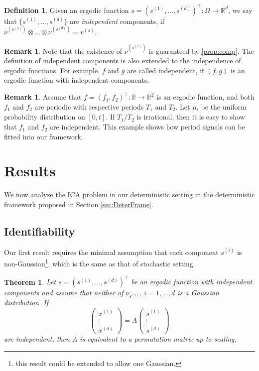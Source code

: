 \documentclass[twoside]{article}
\newcommand{\xcom}[1]{x^{(#1)}}
\newcommand{\scom}[1]{s^{(#1)}}
\newcommand{\real}{\mathbb{R}}
\newtheorem{thm}[lemma]{Theorem}
\theoremstyle{definition}
\newtheorem{definition}[lemma]{Definition}
\newtheorem{remark}[lemma]{Remark}
\begin{document}
\begin{definition}
Given an ergodic function $s = (s^{(1)},\ldots, s^{(d)})^{\top}:\Omega \rightarrow \real^d$, 
we say that $\{s^{(1)},\ldots, s^{(d)}\}$ are \emph{independent} components, 
	if $\nu^{(s^{(1)})}\otimes\ldots\otimes\nu^{(s^{(d)})} = v^{(s)}$.
\end{definition}
\begin{remark}
Note that the existence of $\nu^{(s^{(i)})}$ is guaranteed by \ref{prop:comp}. 
The definition of independent components is also extended to the independence of ergodic functions. 
For example, $f$ and $g$ are called independent, if $(f,g)$ is an ergodic function with independent components. 
\end{remark}
\begin{remark}
Assume that $f = (f_1,f_2)^{\top}:\real\rightarrow\real^2$ is an ergodic function, and both $f_1$ and $f_2$ are periodic with respective periods $T_1$ and $T_2$. 
Let $\mu_t$ be the uniform probability distribution on $[0,t]$. 
 If $T_1/T_2$ is irrational, then it is easy to show that $f_1$ and $f_2$ are independent. 
 This example shows how period signals can be fitted into our framework.
\end{remark}

\section{Results}
\label{sec:Results}
We now analyze the ICA problem in our deterministic setting in the deterministic framework proposed in Section \ref{sec:DeterFrame}.

\subsection{Identifiability}
\label{subsec:Indentifiability}
Our first result requires the minimal assumption that each component $s^{(i)}$ is non-Gaussian\footnote{this result could be extended to allow one Gaussian.}, which is the same as that of stochastic setting.
\begin{thm}
\label{thm:CorofICA}
Let $s = (\scom{1},\ldots,\scom{d})^{\top}$ be an ergodic function with independent components and %
assume that neither of $\nu_{\scom{i}}$, $i=1,\ldots,d$ is a Gaussian distribution. If
\begin{equation}
\left(
\begin{array}{ccc}
\xcom{1} \\
\vdots \\
\xcom{d}
\end{array}
\right) = A
\left(
\begin{array}{ccc}
\scom{1} \\
\vdots \\
\scom{d}
\end{array}
\right)
\end{equation}
are independent, then $A$ is equivalent to a permutation matrix up to scaling.
\end{thm}
\end{document}
